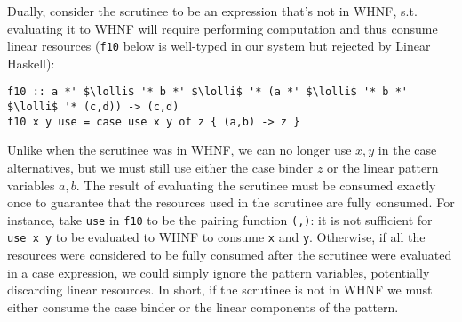 \documentclass[acmsmall,review,anonymous,screen]{acmart}
\newcommand{\incode}[1]{\lstinline{#1}}
\newcommand{\lolli}{\multimap}
\begin{document}
Dually, consider the scrutinee to be an expression that's not in WHNF, s.t.
evaluating it to WHNF will require performing computation and thus consume linear
resources (\incode{f10} below is well-typed in our system but rejected
by Linear Haskell):
\begin{notyet}
\begin{lstlisting}
f10 :: a *' $\lolli$ '* b *' $\lolli$ '* (a *' $\lolli$ '* b *' $\lolli$ '* (c,d)) -> (c,d)
f10 x y use = case use x y of z { (a,b) -> z }
\end{lstlisting}
\end{notyet}
Unlike when the scrutinee was in WHNF, we can no longer use $x,y$ in the case
alternatives, but we must still use either the case binder $z$ or the linear
pattern variables $a,b$. %
%
%
The result of evaluating the scrutinee must be consumed exactly once to guarantee
that the resources used in the scrutinee are fully consumed. %
For instance, take
\incode{use} in \incode{f10} to be the pairing function \incode{(,)}: it is not sufficient for \incode{use x y} to be
evaluated to WHNF to consume \incode{x} and \incode{y}. Otherwise, if all the resources were
considered to be fully consumed after the scrutinee were evaluated in a case
expression, we could simply ignore the pattern variables, potentially
discarding linear resources. In
short, if the scrutinee is not in WHNF we must either consume the case binder
or the linear components of the pattern.
\end{document}
